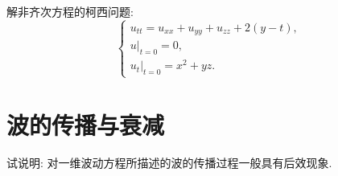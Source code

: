 \begin{exercise}[8]
  解非齐次方程的柯西问题:
  \[\begin{cases}
    u_{tt} = u_{xx}+u_{yy}+u_{zz}+2(y-t), \\
    u|_{t=0} = 0, \\
    u_t|_{t=0} = x^2+yz.
  \end{cases}\]
\end{exercise}



\section{波的传播与衰减}

\begin{exercise}
  试说明: 对一维波动方程所描述的波的传播过程一般具有后效现象.
\end{exercise}



